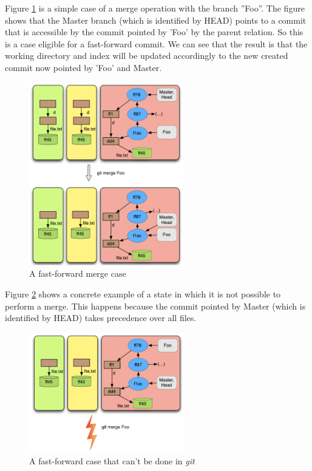 Figure \ref{fig:ffmerge1} is a simple case of a merge operation with
the branch ''Foo''. The figure
shows that the Master branch (which is identified by HEAD) points to
a commit that is accessible by the commit pointed by 'Foo' by the
parent relation. So this is
a case eligible for a fast-forward commit.  We can see that the result
is that the working directory and index will be updated accordingly to
the new created commit now pointed by 'Foo' and Master.\\

\begin{figure}[htp]
   \centering
   \includegraphics[width=0.6\textwidth]{images/fast_forward_merge1.png}
   \caption{A fast-forward merge case}\label{fig:ffmerge1}
\end{figure}

Figure \ref{fig:ffmergepre} shows a concrete example of a state in
which it is not possible to perform a merge. This happens because 
the commit pointed by Master (which is identified by HEAD) takes
precedence over all files. \\

\begin{figure}[htp]
   \centering
   \includegraphics[width=0.6\textwidth]{images/fast_forward_merge_pre.png}
   \caption{A fast-forward case that can't be done in
   \emph{git}}\label{fig:ffmergepre}
\end{figure}

